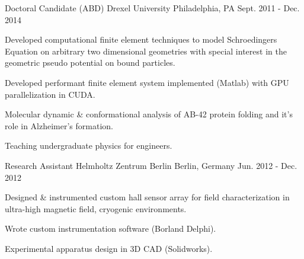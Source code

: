 \begin{cventries}
  \cventry
    {Doctoral Candidate (ABD)} %
    {Drexel University} %
    {Philadelphia, PA} %
    {Sept. 2011 - Dec. 2014} %
    {
      \begin{cvitems} %
        \item {Developed computational finite element techniques to model Schroedingers Equation on arbitrary two dimensional geometries with special interest in the geometric pseudo potential on bound particles.}
        \item {Developed performant finite element system implemented (Matlab) with GPU parallelization in CUDA.}
        \item {Molecular dynamic \& conformational analysis of AB-42 protein folding and it's role in Alzheimer's formation.}
        \item {Teaching undergraduate physics for engineers.}
      \end{cvitems}
    }

  \cventry
    {Research Assistant} %
    {Helmholtz Zentrum Berlin} %
    {Berlin, Germany} %
    {Jun. 2012 - Dec. 2012} %
    {
      \begin{cvitems} %
        \item {Designed \& instrumented custom hall sensor array for field characterization in ultra-high magnetic field, cryogenic environments.}
        \item {Wrote custom instrumentation software (Borland Delphi).}
        \item {Experimental apparatus design in 3D CAD (Solidworks).}
      \end{cvitems}
    }

\end{cventries}
